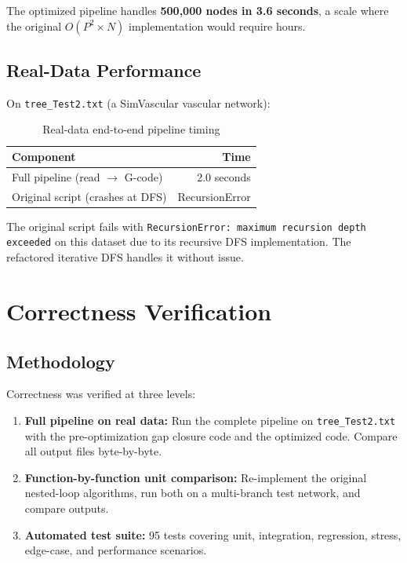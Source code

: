 \documentclass[11pt,a4paper]{article}
\begin{document}
The optimized pipeline handles \textbf{500,000 nodes in 3.6 seconds}, a scale where the original $O(P^2 \times N)$ implementation would require hours.

\subsection{Real-Data Performance}

On \texttt{tree\_Test2.txt} (a SimVascular vascular network):

\begin{table}[H]
\centering
\caption{Real-data end-to-end pipeline timing}
\begin{tabular}{lr}
\toprule
\textbf{Component} & \textbf{Time} \\
\midrule
Full pipeline (read $\rightarrow$ G-code) & 2.0 seconds \\
Original script (crashes at DFS) & RecursionError \\
\bottomrule
\end{tabular}
\end{table}

The original script fails with \texttt{RecursionError: maximum recursion depth exceeded} on this dataset due to its recursive DFS implementation. The refactored iterative DFS handles it without issue.


\section{Correctness Verification}

\subsection{Methodology}

Correctness was verified at three levels:

\begin{enumerate}[leftmargin=2em]
    \item \textbf{Full pipeline on real data:} Run the complete pipeline on \texttt{tree\_Test2.txt} with the pre-optimization gap closure code and the optimized code. Compare all output files byte-by-byte.
    \item \textbf{Function-by-function unit comparison:} Re-implement the original nested-loop algorithms, run both on a multi-branch test network, and compare outputs.
    \item \textbf{Automated test suite:} 95 tests covering unit, integration, regression, stress, edge-case, and performance scenarios.
\end{enumerate}
\end{document}
